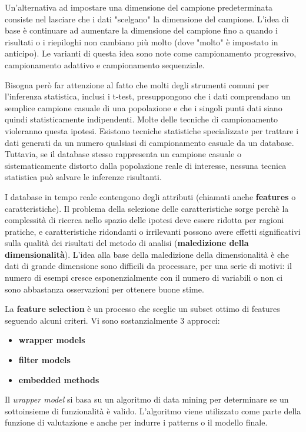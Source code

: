 \documentclass[a4paper]{extarticle}
\begin{document}
Un'alternativa ad impostare una dimensione del campione predeterminata consiste nel lasciare che i dati "scelgano" la dimensione del campione. L'idea di base è continuare ad aumentare la dimensione del campione fino a quando i risultati o i riepiloghi non cambiano più molto (dove "molto" è impostato in anticipo). Le varianti di questa idea sono note come campionamento progressivo, campionamento adattivo e campionamento sequenziale.

Bisogna però far attenzione al fatto che molti degli strumenti comuni per l'inferenza statistica, inclusi i t-test, presuppongono che i dati comprendano un semplice campione casuale di una popolazione e che i singoli punti dati siano quindi statisticamente indipendenti. Molte delle tecniche di campionamento violeranno questa ipotesi. Esistono tecniche statistiche specializzate per trattare i dati generati da un numero qualsiasi di  campionamento casuale da un database. Tuttavia, se il database stesso rappresenta un campione casuale o sistematicamente distorto dalla popolazione reale di interesse, nessuna tecnica statistica può salvare le inferenze risultanti.

I database in tempo reale contengono degli attributi (chiamati anche \textbf{features} o caratteristiche). Il problema della selezione delle caratteristiche sorge perchè la complessità di ricerca nello spazio delle ipotesi deve essere ridotta per ragioni pratiche, e caratteristiche ridondanti o irrilevanti possono avere effetti significativi sulla qualità dei risultati del metodo di analisi (\textbf{maledizione della dimensionalità}). L'idea alla base della maledizione della dimensionalità è che dati di grande dimensione sono difficili da processare, per una serie di motivi: il numero di esempi cresce esponenzialmente con il numero di variabili o non ci sono abbastanza osservazioni per ottenere buone stime.

La \textbf{feature selection} è un processo che sceglie un subset ottimo di features seguendo alcuni criteri. Vi sono sostanzialmente 3 approcci:
\begin{itemize}
\item \textbf{wrapper models}
\item \textbf{filter models}
\item \textbf{embedded methods}
\end{itemize}

Il \textit{wrapper model} si basa su un algoritmo di data mining per determinare se un sottoinsieme di funzionalità è valido. L'algoritmo viene utilizzato come parte della funzione di valutazione e anche per indurre i patterns o il modello finale. 
\end{document}
